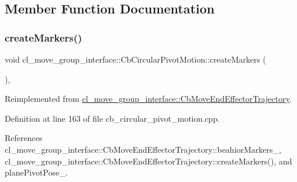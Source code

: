 \subsection{Member Function Documentation}
\mbox{\label{classcl__move__group__interface_1_1CbCircularPivotMotion_a48911ad62608cb00c04e979e2f6f644a}} 
\subsubsection{\texorpdfstring{create\+Markers()}{createMarkers()}}
{\footnotesize\ttfamily void cl\+\_\+move\+\_\+group\+\_\+interface\+::\+Cb\+Circular\+Pivot\+Motion\+::create\+Markers (\begin{DoxyParamCaption}{ }\end{DoxyParamCaption})\hspace{0.3cm}{\ttfamily [override]}, {\ttfamily [virtual]}}



Reimplemented from \hyperlink{classcl__move__group__interface_1_1CbMoveEndEffectorTrajectory_a442efa1d5bc9e9a16f74ecd31b13d9b5}{cl\+\_\+move\+\_\+group\+\_\+interface\+::\+Cb\+Move\+End\+Effector\+Trajectory}.



Definition at line 163 of file cb\+\_\+circular\+\_\+pivot\+\_\+motion.\+cpp.



References cl\+\_\+move\+\_\+group\+\_\+interface\+::\+Cb\+Move\+End\+Effector\+Trajectory\+::beahior\+Markers\+\_\+, cl\+\_\+move\+\_\+group\+\_\+interface\+::\+Cb\+Move\+End\+Effector\+Trajectory\+::create\+Markers(), and plane\+Pivot\+Pose\+\_\+.


